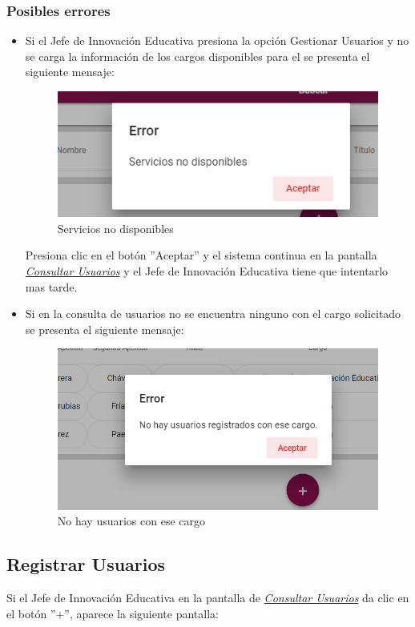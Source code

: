 \subsubsection{Posibles errores}
\begin{itemize}
	\item Si el Jefe de Innovación Educativa  presiona la opción Gestionar Usuarios y no se carga la información de los cargos disponibles para el se presenta el siguiente mensaje:

	\begin{figure}[H]
		\centering
		\includegraphics[width=0.4\linewidth]{images/SP5/MSGSN}
		\caption{Servicios no disponibles}
		\label{SND}

	\end{figure}

	Presiona clic en el botón ''Aceptar'' y  el sistema continua en la pantalla  \hyperlink{consultarUs}{\textit{Consultar Usuarios}} y el Jefe de Innovación Educativa tiene que intentarlo  mas tarde.

	\item Si en la consulta de usuarios no se encuentra ninguno con el cargo solicitado se presenta el siguiente mensaje:
	\begin{figure}[H]
		\centering
		\includegraphics[width=0.4\linewidth]{images/SP5/MSG21}
		\caption{No hay usuarios con ese cargo}
		\label{mensaje21}
	\end{figure}

\end{itemize}


\newpage
\hypertarget{registrarUs}{}
\subsection{Registrar Usuarios}
Si el Jefe de Innovación Educativa  en la pantalla de \hyperlink{consultarUs}{\textit{Consultar Usuarios}} da clic en el botón ''+'', aparece la siguiente pantalla:

